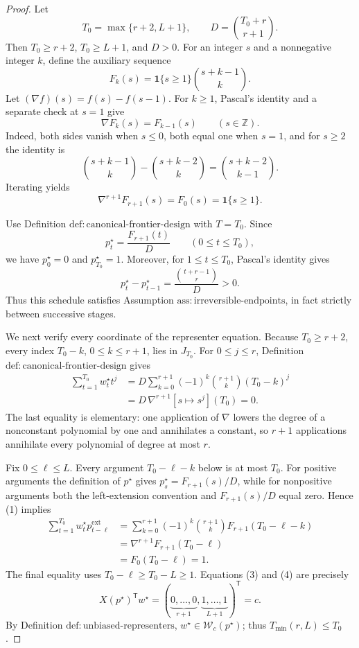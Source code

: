 \documentclass{article}
\begin{document}
\begin{proof}
Let
\[
 T_0=\max\{r+2,L+1\},\qquad D=\binom{T_0+r}{r+1}.
\]
Then \(T_0\ge r+2\), \(T_0\ge L+1\), and \(D>0\).  For an integer \(s\) and a nonnegative integer \(k\), define the auxiliary sequence
\[
 F_k(s)=\mathbf 1\{s\ge1\}\binom{s+k-1}{k}.
\]
Let \((\nabla f)(s)=f(s)-f(s-1)\).  For \(k\ge1\), Pascal's identity and a separate check at \(s=1\) give
\[
 \nabla F_k(s)=F_{k-1}(s)\qquad(s\in\mathbb Z).
\]
Indeed, both sides vanish when \(s\le0\), both equal one when \(s=1\), and for \(s\ge2\) the identity is
\[
 \binom{s+k-1}{k}-\binom{s+k-2}{k}
 =\binom{s+k-2}{k-1}.
\]
Iterating yields
\[
 \nabla^{r+1}F_{r+1}(s)=F_0(s)=\mathbf 1\{s\ge1\}.
 \tag{1}
\]

Use Definition \(\mathrm{def:canonical\text{-}frontier\text{-}design}\) with \(T=T_0\).  Since
\[
 p_t^\star=\frac{F_{r+1}(t)}{D}\qquad(0\le t\le T_0),
\]
we have \(p_0^\star=0\) and \(p_{T_0}^\star=1\).  Moreover, for \(1\le t\le T_0\), Pascal's identity gives
\[
 p_t^\star-p_{t-1}^\star
 =\frac{\binom{t+r-1}{r}}{D}>0.
 \tag{2}
\]
Thus this schedule satisfies Assumption \(\mathrm{ass:irreversible\text{-}endpoints}\), in fact strictly between successive stages.

We next verify every coordinate of the representer equation.  Because \(T_0\ge r+2\), every index \(T_0-k\), \(0\le k\le r+1\), lies in \(J_{T_0}\).  For \(0\le j\le r\), Definition \(\mathrm{def:canonical\text{-}frontier\text{-}design}\) gives
\[
\begin{aligned}
 \sum_{t=1}^{T_0}w_t^\star t^j
 &=D\sum_{k=0}^{r+1}(-1)^k\binom{r+1}{k}(T_0-k)^j\\
 &=D\,\nabla^{r+1}[s\mapsto s^j](T_0)=0.
\end{aligned}
\tag{3}
\]
The last equality is elementary: one application of \(\nabla\) lowers the degree of a nonconstant polynomial by one and annihilates a constant, so \(r+1\) applications annihilate every polynomial of degree at most \(r\).

Fix \(0\le\ell\le L\).  Every argument \(T_0-\ell-k\) below is at most \(T_0\).  For positive arguments the definition of \(p^\star\) gives \(p_s^\star=F_{r+1}(s)/D\), while for nonpositive arguments both the left-extension convention and \(F_{r+1}(s)/D\) equal zero.  Hence (1) implies
\[
\begin{aligned}
 \sum_{t=1}^{T_0}w_t^\star p_{t-\ell}^{\mathrm{ext}}
 &=\sum_{k=0}^{r+1}(-1)^k\binom{r+1}{k}F_{r+1}(T_0-\ell-k)\\
 &=\nabla^{r+1}F_{r+1}(T_0-\ell)\\
 &=F_0(T_0-\ell)=1.
\end{aligned}
\tag{4}
\]
The final equality uses \(T_0-\ell\ge T_0-L\ge1\).  Equations (3) and (4) are precisely
\[
 X(p^\star)^{\mathsf T}w^\star
 =(\underbrace{0,\ldots,0}_{r+1},
   \underbrace{1,\ldots,1}_{L+1})^{\mathsf T}=c.
\]
By Definition \(\mathrm{def:unbiased\text{-}representers}\), \(w^\star\in\mathcal W_c(p^\star)\); thus \(T_{\min}(r,L)\le T_0\).


\end{proof}
\end{document}
